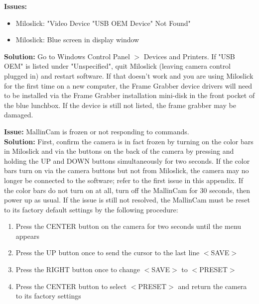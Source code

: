 \documentclass[12pt,titlepage]{article}
\begin{document}
\textbf{\flushleft Issues:}
\begin{itemize}
	\item Miloslick: "Video Device "USB OEM Device" Not Found"
	\item Miloslick: Blue screen in display window
\end{itemize}
\textbf{Solution:} Go to Windows Control Panel $>$ Devices and Printers.
If "USB OEM" is listed under "Unspecified", quit Miloslick (leaving camera control plugged in) and restart software.
If that doesn't work and you are using Miloslick for the first time on a new computer, the Frame Grabber device drivers will need to be installed via the Frame Grabber installation mini-disk in the front pocket of the blue lunchbox. If the device is still not listed, the frame grabber may be damaged.

\textbf{\flushleft Issue:} MallinCam is frozen or not responding to commands.\\
\textbf{Solution:} First, confirm the camera is in fact frozen by turning on the color bars in Miloslick and via the buttons on the back of the camera by pressing and holding the UP and DOWN buttons simultaneously for two seconds. If the color bars turn on via the camera buttons but not from Miloslick, the camera may no longer be connected to the software; refer to the first issue in this appendix. If the color bars do not turn on at all, turn off the MallinCam for 30 seconds, then power up as usual. If the issue is still not resolved, the MallinCam must be reset to its factory default settings by the following procedure:
\begin{enumerate}
	\item Press the CENTER button on the camera for two seconds until the menu appears
	\item Press the UP button once to send the cursor to the last line $<$SAVE$>$
	\item Press the RIGHT button once to change $<$SAVE$>$ to $<$PRESET$>$
	\item Press the CENTER button to select $<$PRESET$>$ and return the camera to its factory settings
\end{enumerate}
\end{document}
